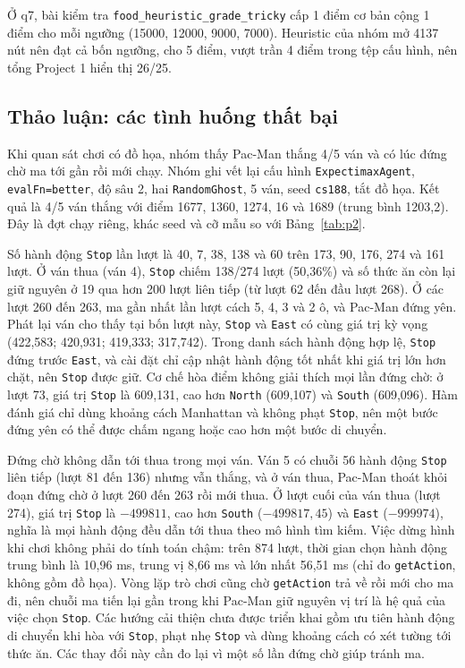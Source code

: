\documentclass[conference]{IEEEtran}
\begin{document}
Ở q7, bài kiểm tra \texttt{food\_heuristic\_grade\_tricky} cấp 1 điểm cơ bản cộng 1 điểm cho mỗi ngưỡng (15000, 12000, 9000, 7000). Heuristic của nhóm mở 4137 nút nên đạt cả bốn ngưỡng, cho 5 điểm, vượt trần 4 điểm trong tệp cấu hình, nên tổng Project 1 hiển thị 26/25.

\subsection{Thảo luận: các tình huống thất bại}
Khi quan sát chơi có đồ họa, nhóm thấy Pac-Man thắng 4/5 ván và có lúc đứng chờ ma tới gần rồi mới chạy. Nhóm ghi vết lại cấu hình \texttt{ExpectimaxAgent}, \texttt{evalFn=better}, độ sâu 2, hai \texttt{RandomGhost}, 5 ván, seed \texttt{cs188}, tắt đồ họa. Kết quả là 4/5 ván thắng với điểm 1677, 1360, 1274, 16 và 1689 (trung bình 1203,2). Đây là đợt chạy riêng, khác seed và cỡ mẫu so với Bảng~\ref{tab:p2}.

Số hành động \texttt{Stop} lần lượt là 40, 7, 38, 138 và 60 trên 173, 90, 176, 274 và 161 lượt. Ở ván thua (ván 4), \texttt{Stop} chiếm 138/274 lượt (50,36\%) và số thức ăn còn lại giữ nguyên ở 19 qua hơn 200 lượt liên tiếp (từ lượt 62 đến đầu lượt 268). Ở các lượt 260 đến 263, ma gần nhất lần lượt cách 5, 4, 3 và 2 ô, và Pac-Man đứng yên. Phát lại ván cho thấy tại bốn lượt này, \texttt{Stop} và \texttt{East} có cùng giá trị kỳ vọng (422,583; 420,931; 419,333; 317,742). Trong danh sách hành động hợp lệ, \texttt{Stop} đứng trước \texttt{East}, và cài đặt chỉ cập nhật hành động tốt nhất khi giá trị lớn hơn chặt, nên \texttt{Stop} được giữ. Cơ chế hòa điểm không giải thích mọi lần đứng chờ: ở lượt 73, giá trị \texttt{Stop} là 609,131, cao hơn \texttt{North} (609,107) và \texttt{South} (609,096). Hàm đánh giá chỉ dùng khoảng cách Manhattan và không phạt \texttt{Stop}, nên một bước đứng yên có thể được chấm ngang hoặc cao hơn một bước di chuyển.

Đứng chờ không dẫn tới thua trong mọi ván. Ván 5 có chuỗi 56 hành động \texttt{Stop} liên tiếp (lượt 81 đến 136) nhưng vẫn thắng, và ở ván thua, Pac-Man thoát khỏi đoạn đứng chờ ở lượt 260 đến 263 rồi mới thua. Ở lượt cuối của ván thua (lượt 274), giá trị \texttt{Stop} là $-499811$, cao hơn \texttt{South} ($-499817{,}45$) và \texttt{East} ($-999974$), nghĩa là mọi hành động đều dẫn tới thua theo mô hình tìm kiếm. Việc dừng hình khi chơi không phải do tính toán chậm: trên 874 lượt, thời gian chọn hành động trung bình là 10,96 ms, trung vị 8,66 ms và lớn nhất 56,51 ms (chỉ đo \texttt{getAction}, không gồm đồ họa). Vòng lặp trò chơi cũng chờ \texttt{getAction} trả về rồi mới cho ma đi, nên chuỗi ma tiến lại gần trong khi Pac-Man giữ nguyên vị trí là hệ quả của việc chọn \texttt{Stop}. Các hướng cải thiện chưa được triển khai gồm ưu tiên hành động di chuyển khi hòa với \texttt{Stop}, phạt nhẹ \texttt{Stop} và dùng khoảng cách có xét tường tới thức ăn. Các thay đổi này cần đo lại vì một số lần đứng chờ giúp tránh ma.
\end{document}
